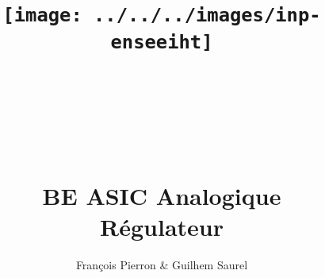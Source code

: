 \documentclass{article}
\title{\texttt{[image: ../../../images/inp-enseeiht]} \\ ~ \\ ~ \\ ~ \\ ~ \\ BE ASIC Analogique \\ Régulateur}
\author{François Pierron \& Guilhem Saurel}
\date{\oldstylenums{\today}}
\begin{document}
\begin{titlepage}
    \setcounter{page}{0}
    \maketitle
    \vfill
    \tableofcontents
    \thispagestyle{empty}
\end{titlepage}
\end{document}
